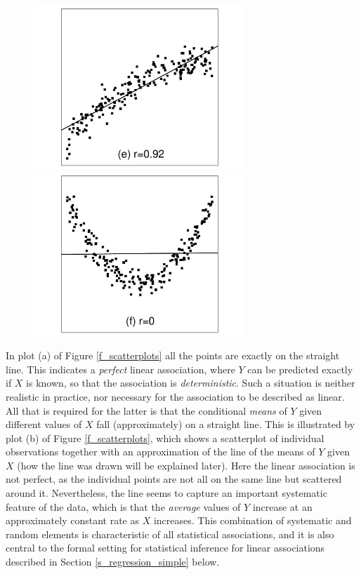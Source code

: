 \begin{figure}
\begin{center}
\includegraphics[width=8cm]{olspl5}
\includegraphics[width=8cm]{olspl6}\\
\end{center}
\end{figure}

In plot (a) of Figure \ref{f_scatterplots} all the points are exactly on
the straight line. This indicates a \emph{perfect} linear association,
where $Y$ can be predicted exactly if $X$ is known, so that the association is
\emph{deterministic}. Such a situation is neither realistic in
practice, nor necessary for the association to be
described as linear. All that is required for the latter is that the
conditional \emph{means} of $Y$ given different values of $X$ fall
(approximately) on a straight line. This is illustrated by plot (b) of
Figure \ref{f_scatterplots}, which shows a scatterplot of individual
observations together with an approximation of the line of the means of
$Y$ given $X$ (how the line was drawn will be explained later). Here the
linear association is not perfect, as the individual points are not all
on the same line but scattered around it. Nevertheless, the line seems
to capture an important systematic feature of the data, which is that
the \emph{average} values of $Y$ increase at an approximately constant
rate as $X$ increases. This combination of systematic and random
elements is characteristic of all statistical associations, and it is
also central to the formal setting for statistical inference for linear
associations described in Section \ref{s_regression_simple} below.

